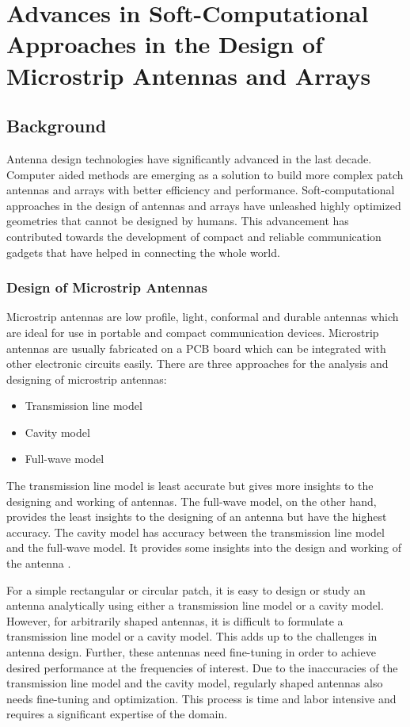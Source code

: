 \chapter{Advances in Soft-Computational Approaches in the Design of Microstrip Antennas and Arrays}
\label{chap:chap2}
\section{Background} \label{c2sec_background}
Antenna design technologies have significantly advanced in the last decade. Computer aided methods are emerging as a solution to build more complex patch antennas and arrays with better efficiency and performance. Soft-computational approaches in the design of antennas and arrays have unleashed highly optimized geometries that cannot be designed by humans. This advancement has contributed towards the development of compact and reliable communication gadgets that have helped in connecting the whole world.

\subsection{Design of Microstrip Antennas}
Microstrip antennas are low profile, light, conformal and durable antennas which are ideal for use in portable and compact communication devices. Microstrip antennas are usually fabricated on a PCB board which can be integrated with other electronic circuits easily. There are three approaches for the analysis and designing of microstrip antennas:
\begin{itemize}
\item Transmission line model
\item Cavity model
\item Full-wave model
\end{itemize}

The transmission line model is least accurate but gives more insights to the designing and working of antennas. The full-wave model, on the other hand, provides the least insights to the designing of an antenna but have the highest accuracy. The cavity model has accuracy between the transmission line model and the full-wave model. It provides some insights into the design and working of the antenna \cite{balanis}.

For a simple rectangular or circular patch, it is easy to design or study an antenna analytically using either a transmission line model or a cavity model. However, for arbitrarily shaped antennas, it is difficult to formulate a transmission line model or a cavity model. This adds up to the challenges in antenna design. Further, these antennas need fine-tuning in order to achieve desired performance at the frequencies of interest. Due to the inaccuracies of the transmission line model and the cavity model, regularly shaped antennas also needs fine-tuning and optimization. This process is time and labor intensive and requires a significant expertise of the domain.

